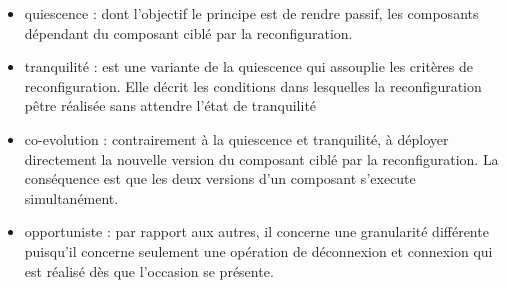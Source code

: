 \begin{itemize}
\item quiescence : dont l'objectif le principe est de rendre passif,
les composants dépendant du composant ciblé par la reconfiguration. 
\item tranquilité : est une variante de la quiescence qui assouplie
les critères de reconfiguration. Elle décrit les conditions dans
lesquelles la reconfiguration pêtre réalisée sans attendre l'état de
tranquilité
\item co-evolution : contrairement à la quiescence et tranquilité, à
déployer directement la nouvelle version du composant ciblé par la
reconfiguration. La conséquence est que les deux versions d'un
composant s'execute simultanément. 
\item opportuniste : par rapport aux autres, il concerne une
granularité différente puisqu'il concerne seulement une opération de
déconnexion et connexion qui est réalisé dès que l'occasion se
présente.  
\end{itemize}




